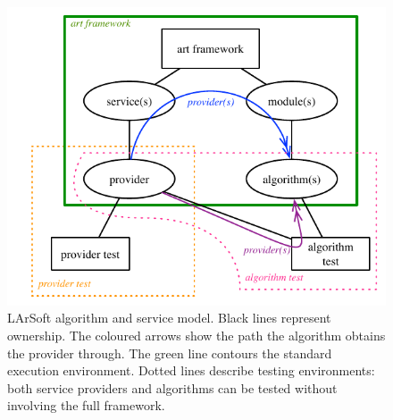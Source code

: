 \begin{figure}
   \centering
   \includegraphics{figures/LArSoftFactorizationModelAndTests}
   \caption[LArSoft algorithm and service model]{
      \label{fig:AlgorithmModel}
      LArSoft algorithm and service model.
      Black lines represent ownership.
      The coloured arrows show the path the algorithm obtains the provider through.
      The green line contours the standard execution environment.
      Dotted lines describe testing environments:
      both service providers and algorithms can be tested without involving the full framework.
   }
\end{figure}

